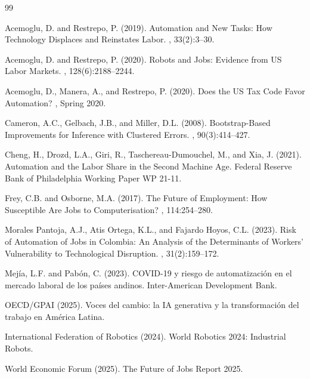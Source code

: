 \documentclass{article}
\begin{document}
\begin{thebibliography}{99}

Acemoglu, D. and Restrepo, P. (2019).
\newblock Automation and New Tasks: How Technology Displaces and Reinstates Labor.
, 33(2):3--30.

Acemoglu, D. and Restrepo, P. (2020).
\newblock Robots and Jobs: Evidence from US Labor Markets.
, 128(6):2188--2244.

Acemoglu, D., Manera, A., and Restrepo, P. (2020).
\newblock Does the US Tax Code Favor Automation?
, Spring 2020.

Cameron, A.C., Gelbach, J.B., and Miller, D.L. (2008).
\newblock Bootstrap-Based Improvements for Inference with Clustered Errors.
, 90(3):414--427.

Cheng, H., Drozd, L.A., Giri, R., Taschereau-Dumouchel, M., and Xia, J. (2021).
\newblock Automation and the Labor Share in the Second Machine Age.
\newblock Federal Reserve Bank of Philadelphia Working Paper WP 21-11.

Frey, C.B. and Osborne, M.A. (2017).
\newblock The Future of Employment: How Susceptible Are Jobs to Computerisation?
, 114:254--280.

Morales Pantoja, A.J., Atis Ortega, K.L., and Fajardo Hoyos, C.L. (2023).
\newblock Risk of Automation of Jobs in Colombia: An Analysis of the Determinants of Workers' Vulnerability to Technological Disruption.
, 31(2):159--172.

Mej\'ia, L.F. and Pab\'on, C. (2023).
\newblock COVID-19 y riesgo de automatizaci\'on en el mercado laboral de los pa\'ises andinos.
\newblock Inter-American Development Bank.

OECD/GPAI (2025).
\newblock Voces del cambio: la IA generativa y la transformaci\'on del trabajo en Am\'erica Latina.

International Federation of Robotics (2024).
\newblock World Robotics 2024: Industrial Robots.

World Economic Forum (2025).
\newblock The Future of Jobs Report 2025.


\end{thebibliography}
\end{document}
